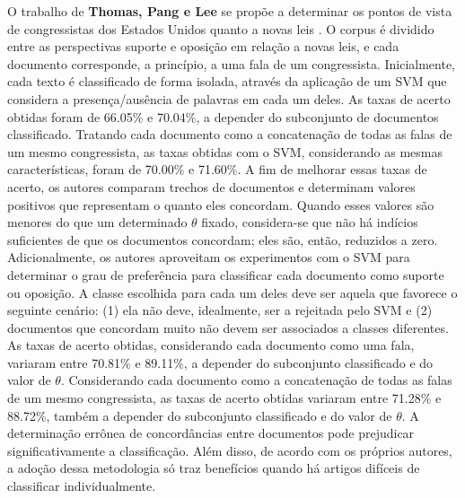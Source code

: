 O trabalho de \textbf{Thomas, Pang e Lee} se propõe a determinar os pontos de vista de congressistas dos Estados Unidos quanto a novas leis \cite{get-out-the-vote}. O corpus é dividido entre as perspectivas suporte e oposição em relação a novas leis, e cada documento corresponde, a princípio, a uma fala de um congressista. Inicialmente, cada texto é classificado de forma isolada, através da aplicação de um SVM que considera a presença/ausência de palavras em cada um deles. As taxas de acerto obtidas foram de 66.05\% e 70.04\%, a depender do subconjunto de documentos classificado. Tratando cada documento como a concatenação de todas as falas de um mesmo congressista, as taxas obtidas com o SVM, considerando as mesmas características, foram de 70.00\% e 71.60\%. A fim de melhorar essas taxas de acerto, os autores comparam trechos de documentos e determinam valores positivos que representam o quanto eles concordam. Quando esses valores são menores do que um determinado \ensuremath{\theta} fixado, considera-se que não há indícios suficientes de que os documentos concordam; eles são, então, reduzidos a zero. Adicionalmente, os autores aproveitam os experimentos com o SVM para determinar o grau de preferência para classificar cada documento como suporte ou oposição. A classe escolhida para cada um deles deve ser aquela que favorece o seguinte cenário: (1) ela não deve, idealmente, ser a rejeitada pelo SVM e (2) documentos que concordam muito não devem ser associados a classes diferentes. As taxas de acerto obtidas, considerando cada documento como uma fala, variaram entre 70.81\% e 89.11\%, a depender do subconjunto classificado e do valor de \ensuremath{\theta}. Considerando cada documento como a concatenação de todas as falas de um mesmo congressista, as taxas de acerto obtidas variaram entre 71.28\% e 88.72\%, também a depender do subconjunto classificado e do valor de \ensuremath{\theta}. A determinação errônea de concordâncias entre documentos pode prejudicar significativamente a classificação. Além disso, de acordo com os próprios autores, a adoção dessa metodologia só traz benefícios quando há artigos difíceis de classificar individualmente.    

